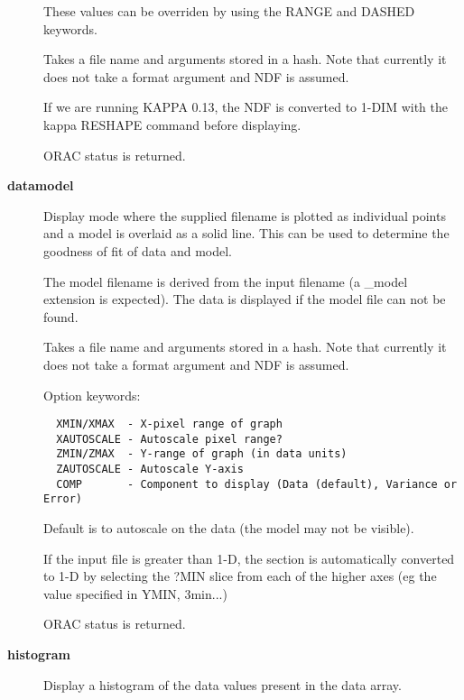 \begin{description}
These values can be overriden by using the RANGE and DASHED 
keywords.



Takes a file name and arguments stored in a hash.
Note that currently it does not take a format argument
and NDF is assumed.



If we are running KAPPA 0.13, the NDF is converted
to 1-DIM with the kappa RESHAPE command before 
displaying.



ORAC status is returned.

\item[\textbf{datamodel}] \mbox{}

Display mode where the supplied filename is plotted as individual
points and a model is overlaid as a solid line. This can be used
to determine the goodness of fit of data and model.



The model filename is derived from the input filename (a \_model
extension is expected). The data is displayed if the model
file can not be found.



Takes a file name and arguments stored in a hash.
Note that currently it does not take a format argument
and NDF is assumed.



Option keywords:

\begin{verbatim}
  XMIN/XMAX  - X-pixel range of graph
  XAUTOSCALE - Autoscale pixel range?
  ZMIN/ZMAX  - Y-range of graph (in data units)
  ZAUTOSCALE - Autoscale Y-axis
  COMP       - Component to display (Data (default), Variance or Error)
\end{verbatim}


Default is to autoscale on the data (the model may not be visible).



If the input file is greater than 1-D, the section is automatically
converted to 1-D by selecting the ?MIN slice from each of the
higher axes (eg the value specified in YMIN, 3min...)



ORAC status is returned.

\item[\textbf{histogram}] \mbox{}

Display a histogram of the data values present in the 
data array.




\end{description}

